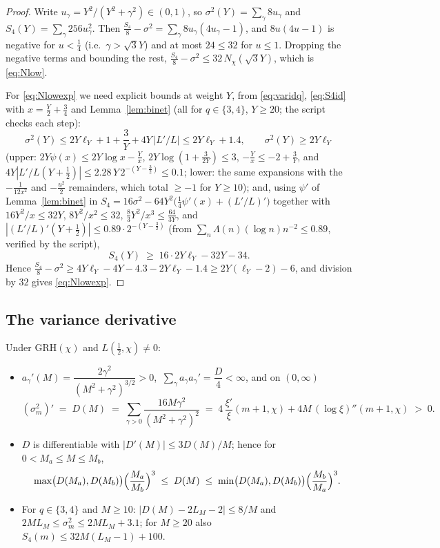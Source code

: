 \begin{proof}
Write $u_\gamma=Y^2/(Y^2+\gamma^2)\in(0,1)$, so
$\sigma^2(Y)=\sum_\gamma8u_\gamma$ and
$S_4(Y)=\sum_\gamma256u_\gamma^2$. Then
$\tfrac{S_4}8-\sigma^2=\sum_\gamma8u_\gamma(4u_\gamma-1)$, and
$8u(4u-1)$ is negative for $u<\tfrac14$ (i.e.\ $\gamma>\sqrt3Y$) and
at most $24\le32$ for $u\le1$. Dropping the negative terms and
bounding the rest,
$\tfrac{S_4}8-\sigma^2\le32\,N_\chi(\sqrt3Y)$, which is
\eqref{eq:Nlow}.

For \eqref{eq:Nlowexp} we need explicit bounds at weight $Y$, from
\eqref{eq:varidq}, \eqref{eq:S4id} with $x=\tfrac Y2+\tfrac34$ and
Lemma~\ref{lem:binet} (all for $q\in\{3,4\}$, $Y\ge20$; the script
checks each step):
\[
\sigma^2(Y)\le2Y\ell_Y+1+\frac3Y+4Y\,|L'/L|\le2Y\ell_Y+1.4,
\qquad
\sigma^2(Y)\ge2Y\ell_Y
\]
(upper: $2Y\psi(x)\le2Y\log x-\tfrac Yx$,
$2Y\log(1+\tfrac3{2Y})\le3$, $-\tfrac Yx\le-2+\tfrac3Y$, and
$4Y|L'/L(Y+\tfrac12)|\le2.28\,Y\,2^{-(Y-\frac32)}\le0.1$;
lower: the same expansions with the $-\tfrac1{12x^2}$ and
$-\tfrac{u^2}2$ remainders, which total $\ge-1$ for $Y\ge10$); and,
using $\psi'$ of Lemma~\ref{lem:binet} in
$S_4=16\sigma^2-64Y^2\bigl(\tfrac14\psi'(x)+(L'/L)'\bigr)$ together
with $16Y^2/x\le32Y$, $8Y^2/x^2\le32$,
$\tfrac{8}{3}Y^2/x^3\le\tfrac{64}{3Y}$, and
$|(L'/L)'(Y+\tfrac12)|\le0.89\cdot2^{-(Y-\frac32)}$
(from $\sum_n\Lambda(n)(\log n)n^{-2}\le0.89$, verified by the
script),
\[
S_4(Y)\;\ge\;16\cdot2Y\ell_Y-32Y-34 .
\]
Hence
$\tfrac{S_4}8-\sigma^2\ge4Y\ell_Y-4Y-4.3-2Y\ell_Y-1.4
\ge2Y(\ell_Y-2)-6$, and division by $32$ gives
\eqref{eq:Nlowexp}.
\end{proof}

\subsection*{The variance derivative}

\begin{lemma}\label{lem:Dprop}
Under GRH$(\chi)$ and $L(\tfrac12,\chi)\ne0$:
\begin{itemize}
\item[(i)] $a_\gamma'(M)=\dfrac{2\gamma^2}{(M^2+\gamma^2)^{3/2}}>0$,
$\ \sum_\gamma a_\gamma a_\gamma'=\dfrac D4<\infty$, and on $(0,\infty)$
\[
(\sigma_m^2)'\;=\;D(M)\;=\;\sum_{\gamma>0}
\frac{16M\gamma^2}{(M^2+\gamma^2)^2}
\;=\;4\,\frac{\xi'}{\xi}(m+1,\chi)+4M\,(\log\xi)''(m+1,\chi)\;>\;0 .
\]
\item[(ii)] $D$ is differentiable with $|D'(M)|\le3D(M)/M$; hence for
$0<M_a\le M\le M_b$,
\[
\max\bigl(D(M_a),D(M_b)\bigr)\Bigl(\frac{M_a}{M_b}\Bigr)^{3}
\;\le\;D(M)\;\le\;
\min\bigl(D(M_a),D(M_b)\bigr)\Bigl(\frac{M_b}{M_a}\Bigr)^{3}.
\]
\item[(iii)] For $q\in\{3,4\}$ and $M\ge10$:
$\bigl|D(M)-2L_M-2\bigr|\le8/M$ and $2ML_M\le\sigma_m^2\le2ML_M+3.1$;
for $M\ge20$ also $S_4(m)\le32M(L_M-1)+100$.
\end{itemize}
\end{lemma}

